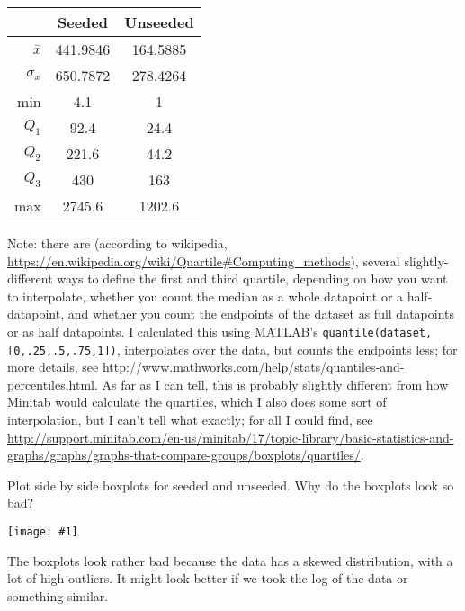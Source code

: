 \documentclass[12pt,letterpaper]{hmcpset}
\newcommand{\image}[1]{\begin{center}\texttt{[image: \#1]}\end{center}}
\begin{document}
\begin{solution}
	\begin{tabular}{r|c|c|}
		& Seeded & Unseeded \\\hline
		$\bar{x}$ & 441.9846 & 164.5885 \\\hline
		$\sigma_x$ & 650.7872 & 278.4264 \\\hline
		min & 4.1 & 1 \\\hline
		$Q_1$ & 92.4 & 24.4 \\\hline
		$Q_2$ & 221.6 & 44.2 \\\hline
		$Q_3$ & 430 & 163 \\\hline
		max & 2745.6 & 1202.6 \\\hline
	\end{tabular}
	
	Note: there are (according to wikipedia, \url{https://en.wikipedia.org/wiki/Quartile#Computing_methods}), several slightly-different ways to define the first and third quartile, depending on how you want to interpolate, whether you count the median as a whole datapoint or a half-datapoint, and whether you count the endpoints of the dataset as full datapoints or as half datapoints. I calculated this using MATLAB's \texttt{quantile(dataset,[0,.25,.5,.75,1])}, interpolates over the data, but counts the endpoints less; for more details, see \url{http://www.mathworks.com/help/stats/quantiles-and-percentiles.html}. As far as I can tell, this is probably slightly different from how Minitab would calculate the quartiles, which I also does some sort of interpolation, but I can't tell what exactly; for all I could find, see \url{http://support.minitab.com/en-us/minitab/17/topic-library/basic-statistics-and-graphs/graphs/graphs-that-compare-groups/boxplots/quartiles/}. 
\end{solution}
\newpage

\begin{problem}[d]

    Plot side by side boxplots for seeded and unseeded. Why do the boxplots look so bad?

\end{problem}
	\image{oct27g3}
	
	The boxplots look rather bad because the data has a skewed distribution, with a lot of high outliers.  It might look better if we took the log of the data or something similar.
\begin{solution}

\end{solution}
\newpage
\end{document}
